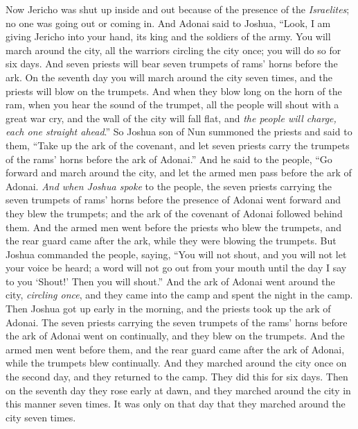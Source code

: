 \begin{biblechapter} %
 Now Jericho was shut up inside and out because of the presence of the \textit{Israelites}; no one was going out or coming in.
\verse And Adonai said to Joshua, “Look, I am giving Jericho into your hand, its king and the soldiers of the army.
\verse You will march around the city, all the warriors circling the city once; you will do so for six days.
\verse And seven priests will bear seven trumpets of rams’ horns before the ark. On the seventh day you will march around the city seven times, and the priests will blow on the trumpets.
\verse And when they blow long on the horn of the ram, when you hear the sound of the trumpet, all the people will shout with a great war cry, and the wall of the city will fall flat, and \textit{the people will charge, each one straight ahead}.”
\verse So Joshua son of Nun summoned the priests and said to them, “Take up the ark of the covenant, and let seven priests carry the trumpets of the rams’ horns before the ark of Adonai.”
\verse And he said to the people, “Go forward and march around the city, and let the armed men pass before the ark of Adonai.
\verse \textit{And when Joshua spoke} to the people, the seven priests carrying the seven trumpets of rams’ horns before the presence of Adonai went forward and they blew the trumpets; and the ark of the covenant of Adonai followed behind them.
\verse And the armed men went before the priests who blew the trumpets, and the rear guard came after the ark, while they were blowing the trumpets.
\verse But Joshua commanded the people, saying, “You will not shout, and you will not let your voice be heard; a word will not go out from your mouth until the day I say to you ‘Shout!’ Then you will shout.”
\verse And the ark of Adonai went around the city, \textit{circling once}, and they came into the camp and spent the night in the camp.
\verse Then Joshua got up early in the morning, and the priests took up the ark of Adonai.
\verse The seven priests carrying the seven trumpets of the rams’ horns before the ark of Adonai went on continually, and they blew on the trumpets. And the armed men went before them, and the rear guard came after the ark of Adonai, while the trumpets blew continually.
\verse And they marched around the city once on the second day, and they returned to the camp. They did this for six days.
\verse Then on the seventh day they rose early at dawn, and they marched around the city in this manner seven times. It was only on that day that they marched around the city seven times.

\end{biblechapter}
